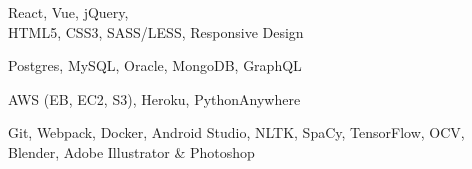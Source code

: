\documentclass[]{hieudo-build}
\begin{document}
\begin{minipage}[t]{0.33\textwidth}
\begin{flushleft}
\normalsize
  React, Vue, jQuery, \\
  HTML5, CSS3, SASS/LESS, Responsive Design
\sectionsep

\normalsize
  Postgres, MySQL, Oracle, MongoDB, GraphQL
\sectionsep

\normalsize
  AWS (EB, EC2, S3), Heroku, PythonAnywhere
\sectionsep

\normalsize
  Git, Webpack, Docker,
  Android Studio, 
  NLTK, SpaCy, TensorFlow, OCV, 
  Blender, 
  Adobe Illustrator \& Photoshop
\sectionsep

  
\end{flushleft}




\end{minipage} 
\hfill



\end{document}
